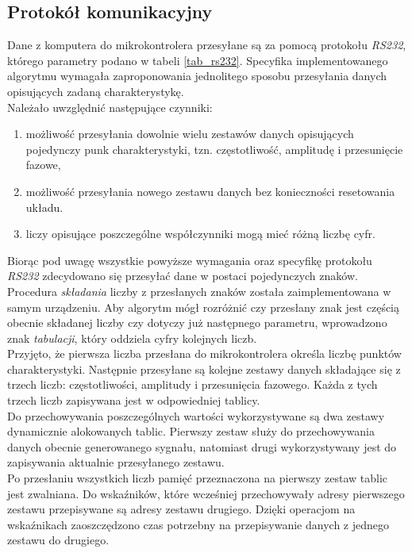 \subsection{Protokół komunikacyjny}
\label{PK}
Dane z komputera do mikrokontrolera przesyłane są za pomocą protokołu \textit{RS232}, którego parametry podano w tabeli \ref{tab_rs232}. Specyfika implementowanego algorytmu wymagała zaproponowania jednolitego sposobu przesyłania danych opisujących zadaną charakterystykę. \\
Należało uwzględnić następujące czynniki:
\begin{enumerate}
	
	\item możliwość przesyłania dowolnie wielu zestawów danych opisujących pojedynczy punk charakterystyki, tzn. częstotliwość, amplitudę i przesunięcie fazowe,
	\item możliwość przesyłania nowego zestawu danych bez konieczności resetowania układu.
	\item liczy opisujące poszczególne współczynniki mogą mieć różną liczbę cyfr.
\end{enumerate}
%
%
Biorąc pod uwagę wszystkie powyższe wymagania oraz specyfikę protokołu \textit{RS232} zdecydowano się przesyłać dane w postaci pojedynczych znaków. Procedura \textit{składania} liczby z przesłanych znaków została zaimplementowana w samym urządzeniu. Aby algorytm mógł rozróżnić czy przesłany znak jest częścią obecnie składanej liczby czy dotyczy już następnego parametru, wprowadzono znak \textit{tabulacji}, który oddziela cyfry kolejnych liczb.
\\
Przyjęto, że pierwsza liczba przesłana do mikrokontrolera określa liczbę punktów charakterystyki. Następnie przesyłane są kolejne zestawy danych składające się z trzech liczb: częstotliwości, amplitudy i przesunięcia fazowego. Każda z tych trzech liczb zapisywana jest w odpowiedniej tablicy.
\\
Do przechowywania poszczególnych wartości wykorzystywane są dwa zestawy dynamicznie alokowanych tablic. Pierwszy zestaw służy do przechowywania danych obecnie generowanego sygnału, natomiast drugi wykorzystywany jest do zapisywania aktualnie przesyłanego zestawu. 
\\
Po przesłaniu wszystkich liczb pamięć przeznaczona na pierwszy zestaw tablic jest zwalniana. Do wska\'zników, które wcześniej przechowywały adresy pierwszego zestawu przepisywane są adresy zestawu drugiego. Dzięki operacjom na wska\'znikach zaoszczędzono czas potrzebny na przepisywanie danych z jednego zestawu do drugiego. 
